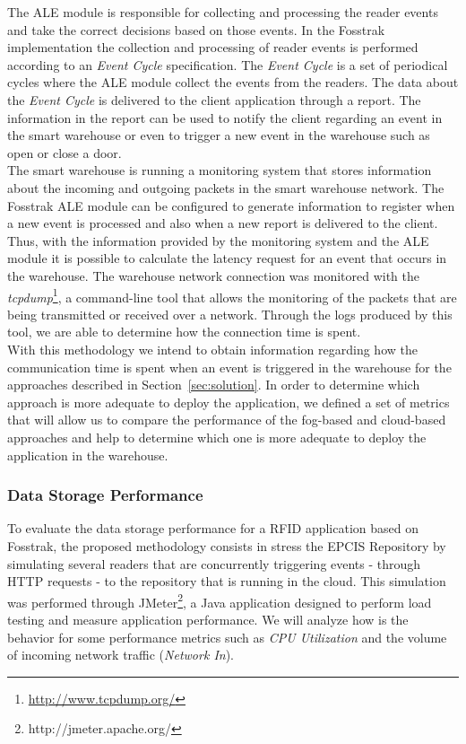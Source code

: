 The \gls{ALE} module is responsible for collecting and processing the reader events and take the
correct decisions based on those events. In the Fosstrak implementation the collection and processing
of reader events is performed according to an \textit{Event Cycle} specification. The \textit{Event Cycle}
is a set of periodical cycles where the \gls{ALE} module collect the events from the readers. The data
about the \textit{Event Cycle} is delivered to the client application through a report. The information
in the report can be used to notify the client regarding an event in the smart warehouse or even to
trigger a new event in the warehouse such as open or close a door.\\

The smart warehouse is running a monitoring system that stores information about the incoming and outgoing
packets in the smart warehouse network. The Fosstrak \gls{ALE} module can be configured to generate
information to register when a new event is processed and also when a new report is delivered to the
client. Thus, with the information provided by the monitoring system and the \gls{ALE} module it is
possible to calculate the latency request for an event that occurs in the warehouse. The warehouse network
connection was monitored with the \textit{tcpdump}\footnote{\url{http://www.tcpdump.org/}}, a command-line
tool that allows the monitoring of the packets that are being transmitted or received over a network.
Through the logs produced by this tool, we are able to determine how the connection time is spent.\\

With this methodology we intend to obtain information regarding how the communication time is spent
when an event is triggered in the warehouse for the approaches described in Section~\ref{sec:solution}.
In order to determine which approach is more adequate to deploy the application, we defined a set of
metrics that will allow us to compare the performance of the fog-based and cloud-based approaches and
help to determine which one is more adequate to deploy the application in the warehouse.\\

\subsubsection{Data Storage Performance}
To evaluate the data storage performance for a RFID application based on Fosstrak, the proposed
methodology consists in stress the EPCIS Repository by simulating several readers that are concurrently
triggering events - through HTTP requests - to the repository that is running in the cloud. This
simulation was performed through JMeter\footnote{http://jmeter.apache.org/}, a Java application
designed to perform load testing and measure application performance. We will analyze how is the
behavior for some performance metrics such as \textit{CPU Utilization} and the volume of incoming
network traffic (\textit{Network In}).


